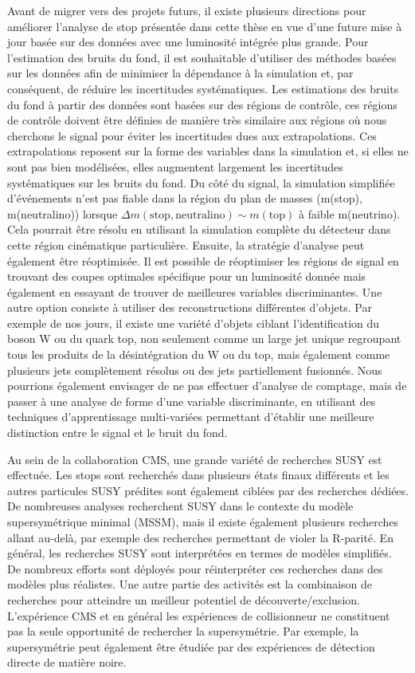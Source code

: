 Avant de migrer vers des projets futurs, il existe plusieurs directions pour améliorer l'analyse de stop présentée dans cette thèse en vue d'une future mise à jour basée sur des données avec une luminosité intégrée plus grande. Pour l'estimation des bruits du fond, il est souhaitable d'utiliser des méthodes basées sur les données afin de minimiser la dépendance à la simulation et, par conséquent, de réduire les incertitudes systématiques. Les estimations des bruits du fond  à partir des  données sont basées sur des régions de contrôle, ces régions de contrôle doivent être définies de manière très similaire aux régions où nous cherchons le signal pour éviter les incertitudes dues aux extrapolations. Ces extrapolations reposent sur la forme des variables dans la simulation et, si elles ne sont pas bien modélisées, elles augmentent largement les incertitudes systématiques sur les bruits du fond. Du côté du signal, la simulation simplifiée d'événements n'est pas fiable dans la région du plan de masses  (m(stop), m(neutralino)) lorsque  $ \Delta m (\mathrm{stop, neutralino}) \sim m(\mathrm{top}) $ à faible m(neutrino). Cela pourrait être résolu en utilisant la simulation complète du détecteur dans cette région cinématique particulière. Ensuite, la stratégie d'analyse peut également être réoptimisée. Il est possible de réoptimiser les régions de signal en trouvant des coupes optimales spécifique pour un luminosité donnée mais également en essayant  de trouver de meilleures variables discriminantes. Une autre option consiste à utiliser des reconstructions différentes d'objets. Par exemple de nos jours, il existe une variété d'objets ciblant l'identification du boson W ou du quark top, non seulement comme un large jet unique regroupant tous les produits de la désintégration du W ou du top, mais également comme plusieurs jets complètement résolus ou des jets partiellement fusionnés. Nous pourrions également envisager de ne pas effectuer d’analyse de comptage, mais de passer à une analyse de forme d'une variable discriminante, en utilisant des techniques d’apprentissage multi-variées permettant d’établir une meilleure distinction entre le signal et le bruit du fond.


Au sein de la collaboration CMS, une grande variété de recherches SUSY est effectuée. Les stops sont recherchés dans plusieurs états finaux différents et les autres particules SUSY prédites sont également ciblées par des recherches dédiées. De nombreuses analyses recherchent SUSY dans le contexte du modèle supersymétrique minimal (MSSM), mais il existe également plusieurs recherches allant au-delà, par exemple des recherches permettant de violer la R-parité. En général, les recherches SUSY sont interprétées en termes de modèles simplifiés. De nombreux efforts sont déployés pour réinterpréter ces recherches dans des modèles plus réalistes. Une autre partie des activités est la combinaison de recherches pour atteindre un meilleur potentiel de découverte/exclusion. L'expérience CMS et en général les expériences de collisionneur ne constituent pas la seule opportunité de rechercher la supersymétrie. Par exemple, la supersymétrie peut également être étudiée par des expériences de détection directe de matière noire.


